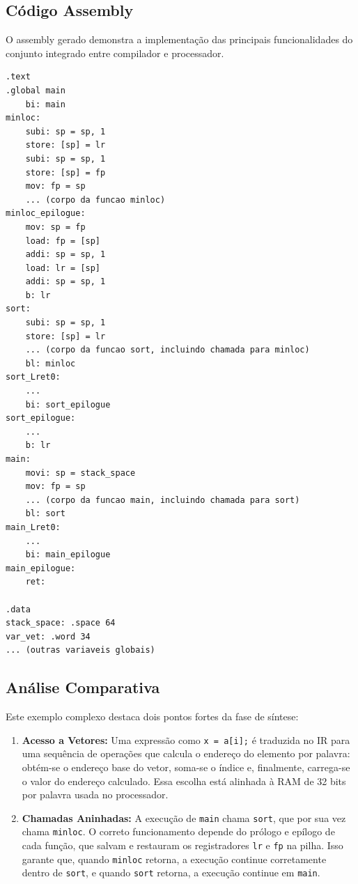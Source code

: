 \documentclass[
	12pt,				%
	oneside,
	a4paper,			%
	english,			%
	french,				%
	spanish,			%
	brazil,				%
	]{abntex2}
\begin{document}
\subsection{Código Assembly}
O assembly gerado demonstra a implementação das principais funcionalidades do conjunto integrado entre compilador e processador.
\begin{lstlisting}[language=assembly, caption={Código Assembly do Exemplo 3 (esboço)}]
.text
.global main
    bi: main
minloc:
    subi: sp = sp, 1
    store: [sp] = lr
    subi: sp = sp, 1
    store: [sp] = fp
    mov: fp = sp
    ... (corpo da funcao minloc)
minloc_epilogue:
    mov: sp = fp
    load: fp = [sp]
    addi: sp = sp, 1
    load: lr = [sp]
    addi: sp = sp, 1
    b: lr
sort:
    subi: sp = sp, 1
    store: [sp] = lr
    ... (corpo da funcao sort, incluindo chamada para minloc)
    bl: minloc
sort_Lret0:
    ...
    bi: sort_epilogue
sort_epilogue:
    ...
    b: lr
main:
    movi: sp = stack_space
    mov: fp = sp
    ... (corpo da funcao main, incluindo chamada para sort)
    bl: sort
main_Lret0:
    ...
    bi: main_epilogue
main_epilogue:
    ret:

.data
stack_space: .space 64
var_vet: .word 34
... (outras variaveis globais)
\end{lstlisting}

\subsection{Análise Comparativa}
Este exemplo complexo destaca dois pontos fortes da fase de síntese:
\begin{enumerate}
    \item \textbf{Acesso a Vetores:} Uma expressão como \texttt{x = a[i];} é traduzida no IR para uma sequência de operações que calcula o endereço do elemento por palavra: obtém-se o endereço base do vetor, soma-se o índice e, finalmente, carrega-se o valor do endereço calculado. Essa escolha está alinhada à RAM de 32 bits por palavra usada no processador.
    \item \textbf{Chamadas Aninhadas:} A execução de \texttt{main} chama \texttt{sort}, que por sua vez chama \texttt{minloc}. O correto funcionamento depende do prólogo e epílogo de cada função, que salvam e restauram os registradores \texttt{lr} e \texttt{fp} na pilha. Isso garante que, quando \texttt{minloc} retorna, a execução continue corretamente dentro de \texttt{sort}, e quando \texttt{sort} retorna, a execução continue em \texttt{main}.
\end{enumerate}
\end{document}

